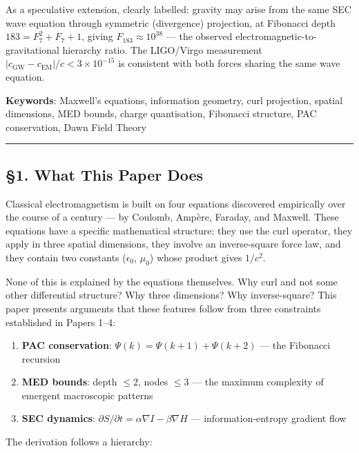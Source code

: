 \documentclass[
  11pt,
  a4paper]{article}
\providecommand{\tightlist}{%
  \setlength{\itemsep}{0pt}\setlength{\parskip}{0pt}}
\begin{document}
As a speculative extension, clearly labelled: gravity may arise from the
same SEC wave equation through symmetric (divergence) projection, at
Fibonacci depth \(183 = F_7^2 + F_7 + 1\), giving
\(F_{183} \approx 10^{38}\) --- the observed
electromagnetic-to-gravitational hierarchy ratio. The LIGO/Virgo
measurement \(|c_\text{GW} - c_\text{EM}|/c < 3 \times 10^{-15}\) is
consistent with both forces sharing the same wave equation.

\textbf{Keywords}: Maxwell's equations, information geometry, curl
projection, spatial dimensions, MED bounds, charge quantisation,
Fibonacci structure, PAC conservation, Dawn Field Theory

\begin{center}\rule{0.5\linewidth}{0.5pt}\end{center}

\subsection{§1. What This Paper Does}\label{what-this-paper-does}

Classical electromagnetism is built on four equations discovered
empirically over the course of a century --- by Coulomb, Ampère,
Faraday, and Maxwell. These equations have a specific mathematical
structure: they use the curl operator, they apply in three spatial
dimensions, they involve an inverse-square force law, and they contain
two constants (\(\epsilon_0\), \(\mu_0\)) whose product gives \(1/c^2\).

None of this is explained by the equations themselves. Why curl and not
some other differential structure? Why three dimensions? Why
inverse-square? This paper presents arguments that these features follow
from three constraints established in Papers 1--4:

\begin{enumerate}
\def\labelenumi{\arabic{enumi}.}
\tightlist
\item
  \textbf{PAC conservation}: \(\Psi(k) = \Psi(k+1) + \Psi(k+2)\) --- the
  Fibonacci recursion
\item
  \textbf{MED bounds}: depth \(\leq 2\), nodes \(\leq 3\) --- the
  maximum complexity of emergent macroscopic patterns
\item
  \textbf{SEC dynamics}:
  \(\partial S/\partial t = \alpha\nabla I - \beta\nabla H\) ---
  information-entropy gradient flow
\end{enumerate}

The derivation follows a hierarchy:
\end{document}
